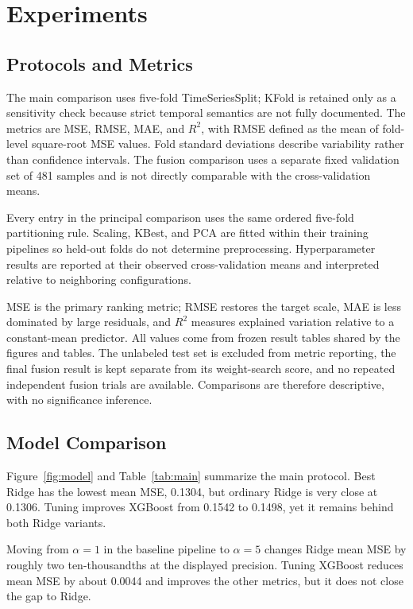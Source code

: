 \documentclass[sigconf,screen,review,anonymous]{acmart}
\begin{document}
\section{Experiments}
\subsection{Protocols and Metrics}
The main comparison uses five-fold TimeSeriesSplit; KFold is retained only as a sensitivity check because strict temporal semantics are not fully documented. The metrics are MSE, RMSE, MAE, and $R^2$, with RMSE defined as the mean of fold-level square-root MSE values. Fold standard deviations describe variability rather than confidence intervals. The fusion comparison uses a separate fixed validation set of 481 samples and is not directly comparable with the cross-validation means.

Every entry in the principal comparison uses the same ordered five-fold partitioning rule. Scaling, KBest, and PCA are fitted within their training pipelines so held-out folds do not determine preprocessing. Hyperparameter results are reported at their observed cross-validation means and interpreted relative to neighboring configurations.

MSE is the primary ranking metric; RMSE restores the target scale, MAE is less dominated by large residuals, and $R^2$ measures explained variation relative to a constant-mean predictor. All values come from frozen result tables shared by the figures and tables. The unlabeled test set is excluded from metric reporting, the final fusion result is kept separate from its weight-search score, and no repeated independent fusion trials are available. Comparisons are therefore descriptive, with no significance inference.

\subsection{Model Comparison}
Figure~\ref{fig:model} and Table~\ref{tab:main} summarize the main protocol. Best Ridge has the lowest mean MSE, 0.1304, but ordinary Ridge is very close at 0.1306. Tuning improves XGBoost from 0.1542 to 0.1498, yet it remains behind both Ridge variants.

Moving from $\alpha=1$ in the baseline pipeline to $\alpha=5$ changes Ridge mean MSE by roughly two ten-thousandths at the displayed precision. Tuning XGBoost reduces mean MSE by about 0.0044 and improves the other metrics, but it does not close the gap to Ridge.
\end{document}
